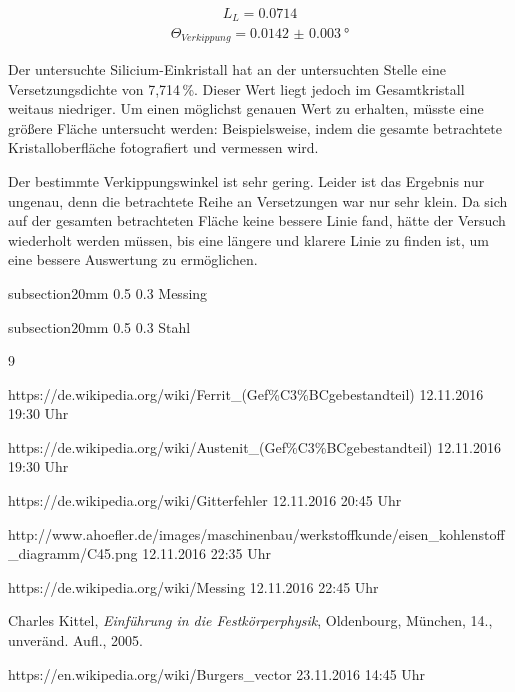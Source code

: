 \documentclass[german, %
parskip=full, %
bibliography=totoc, %
]{scrartcl}
\makeatletter
\renewcommand\subsection{\@startsection 
   {subsection}{2}{0mm}%
   {0.5\baselineskip}%
   {0.3\baselineskip}%
   {\bfseries\sffamily\large}%
   }
\makeatother
\begin{document}
\begin{align*}
L_L = 0.0714
\end{align*}
\begin{align*}
\Theta_{Verkippung} = \SI[separate-uncertainty = true]{0.0142(30)}{\degree}
\end{align*}

Der untersuchte Silicium-Einkristall hat an der untersuchten Stelle eine Versetzungsdichte von 7,714\,\%. Dieser Wert liegt jedoch im Gesamtkristall weitaus niedriger. Um einen möglichst genauen Wert zu erhalten, müsste eine größere Fläche untersucht werden: Beispielsweise, indem die gesamte betrachtete Kristalloberfläche fotografiert und vermessen wird.

Der bestimmte Verkippungswinkel ist sehr gering. Leider ist das Ergebnis nur ungenau, denn die betrachtete Reihe an Versetzungen war nur sehr klein. Da sich auf der gesamten betrachteten Fläche keine bessere Linie fand, hätte der Versuch wiederholt werden müssen, bis eine längere und klarere Linie zu finden ist, um eine bessere Auswertung zu ermöglichen.

\subsection{Messing}

\subsection{Stahl}


\begin{thebibliography}{9}

  https://de.wikipedia.org/wiki/Ferrit\_(Gef\%C3\%BCgebestandteil)
	12.11.2016
	19:30 Uhr
	
  https://de.wikipedia.org/wiki/Austenit\_(Gef\%C3\%BCgebestandteil)
	12.11.2016
	19:30 Uhr
	
  https://de.wikipedia.org/wiki/Gitterfehler
	12.11.2016
	20:45 Uhr	
	
  http://www.ahoefler.de/images/maschinenbau/werkstoffkunde/eisen\_kohlenstoff\_diagramm/C45.png
	12.11.2016
	22:35 Uhr	
	
  https://de.wikipedia.org/wiki/Messing
	12.11.2016
	22:45 Uhr	
	
  Charles Kittel,
  \emph{Einführung in die Festkörperphysik},
  Oldenbourg, München,
  14., unveränd. Aufl.,
  2005.
  
  https://en.wikipedia.org/wiki/Burgers\_vector
	23.11.2016
	14:45 Uhr

\end{thebibliography}
\end{document}
